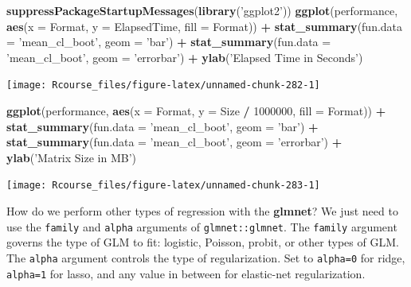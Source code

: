 \documentclass[]{book}
\newenvironment{Shaded}{\begin{snugshade}}{\end{snugshade}}
\newcommand{\KeywordTok}[1]{\textcolor[rgb]{0.13,0.29,0.53}{\textbf{#1}}}
\newcommand{\DataTypeTok}[1]{\textcolor[rgb]{0.13,0.29,0.53}{#1}}
\newcommand{\DecValTok}[1]{\textcolor[rgb]{0.00,0.00,0.81}{#1}}
\newcommand{\StringTok}[1]{\textcolor[rgb]{0.31,0.60,0.02}{#1}}
\newcommand{\OperatorTok}[1]{\textcolor[rgb]{0.81,0.36,0.00}{\textbf{#1}}}
\newcommand{\NormalTok}[1]{#1}
\theoremstyle{definition}
\theoremstyle{definition}
\theoremstyle{definition}
\theoremstyle{remark}
\begin{document}
\begin{Shaded}
\begin{Highlighting}[]
\KeywordTok{suppressPackageStartupMessages}\NormalTok{(}\KeywordTok{library}\NormalTok{(}\StringTok{'ggplot2'}\NormalTok{))}
\KeywordTok{ggplot}\NormalTok{(performance, }\KeywordTok{aes}\NormalTok{(}\DataTypeTok{x =}\NormalTok{ Format, }\DataTypeTok{y =}\NormalTok{ ElapsedTime, }\DataTypeTok{fill =}\NormalTok{ Format)) }\OperatorTok{+}
\StringTok{  }\KeywordTok{stat_summary}\NormalTok{(}\DataTypeTok{fun.data =} \StringTok{'mean_cl_boot'}\NormalTok{, }\DataTypeTok{geom =} \StringTok{'bar'}\NormalTok{) }\OperatorTok{+}
\StringTok{  }\KeywordTok{stat_summary}\NormalTok{(}\DataTypeTok{fun.data =} \StringTok{'mean_cl_boot'}\NormalTok{, }\DataTypeTok{geom =} \StringTok{'errorbar'}\NormalTok{) }\OperatorTok{+}
\StringTok{  }\KeywordTok{ylab}\NormalTok{(}\StringTok{'Elapsed Time in Seconds'}\NormalTok{) }
\end{Highlighting}
\end{Shaded}

\texttt{[image: Rcourse\_files/figure-latex/unnamed-chunk-282-1]}

\begin{Shaded}
\begin{Highlighting}[]
\KeywordTok{ggplot}\NormalTok{(performance, }\KeywordTok{aes}\NormalTok{(}\DataTypeTok{x =}\NormalTok{ Format, }\DataTypeTok{y =}\NormalTok{ Size }\OperatorTok{/}\StringTok{ }\DecValTok{1000000}\NormalTok{, }\DataTypeTok{fill =}\NormalTok{ Format)) }\OperatorTok{+}
\StringTok{  }\KeywordTok{stat_summary}\NormalTok{(}\DataTypeTok{fun.data =} \StringTok{'mean_cl_boot'}\NormalTok{, }\DataTypeTok{geom =} \StringTok{'bar'}\NormalTok{) }\OperatorTok{+}
\StringTok{  }\KeywordTok{stat_summary}\NormalTok{(}\DataTypeTok{fun.data =} \StringTok{'mean_cl_boot'}\NormalTok{, }\DataTypeTok{geom =} \StringTok{'errorbar'}\NormalTok{) }\OperatorTok{+}
\StringTok{  }\KeywordTok{ylab}\NormalTok{(}\StringTok{'Matrix Size in MB'}\NormalTok{) }
\end{Highlighting}
\end{Shaded}

\texttt{[image: Rcourse\_files/figure-latex/unnamed-chunk-283-1]}

How do we perform other types of regression with the \textbf{glmnet}? We
just need to use the \texttt{family} and \texttt{alpha} arguments of
\texttt{glmnet::glmnet}. The \texttt{family} argument governs the type
of GLM to fit: logistic, Poisson, probit, or other types of GLM. The
\texttt{alpha} argument controls the type of regularization. Set to
\texttt{alpha=0} for ridge, \texttt{alpha=1} for lasso, and any value in
between for elastic-net regularization.
\end{document}
